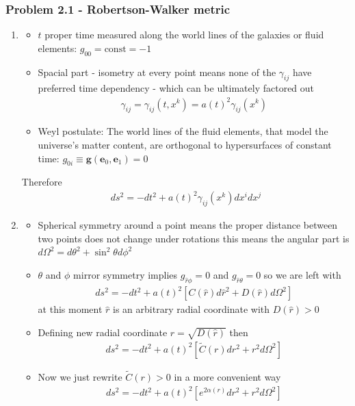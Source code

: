 \documentclass[10pt,a4paper]{book}
\theoremstyle{definition}
\begin{document}
\subsubsection{Problem 2.1 - Robertson-Walker metric}
\begin{enumerate}
\item 
\begin{itemize}
\item $t$ proper time measured along the world lines of the galaxies or fluid elements: $g_{00}=\text{const}=-1$
\item Spacial part - isometry at every point means none of the $\gamma_{ij}$ have preferred time dependency -  which can be ultimately factored out 
\begin{align}
\gamma_{ij}=\gamma_{ij}(t,x^k)=a(t)^2\gamma_{ij}(x^k)
\end{align} 
\item Weyl postulate: The world lines of the fluid elements, that model the universe’s matter content, are orthogonal to hypersurfaces of constant time: $g_{0i}\equiv\mathbf{g}(\mathbf{e}_0,\mathbf{e}_1)=0$
\end{itemize}
Therefore
\begin{align}
ds^2=-dt^2+a(t)^2\gamma_{ij}(x^k)dx^idx^j
\end{align}
\item 
\begin{itemize}
\item Spherical symmetry around a point means the proper distance between two points does not change under rotations this means the angular part is $d\Omega^2=d\theta^2+\sin^2\theta d\phi^2$
\item $\theta$ and $\phi$ mirror symmetry implies $g_{\hat{r}\phi}=0$ and $g_{\hat{r}\theta}=0$ so we are left with
\begin{align}
ds^2=-dt^2+a(t)^2\left[C(\hat{r})d\hat{r}^2+D(\hat{r})d\Omega^2\right]
\end{align}
at this moment $\hat{r}$ is an arbitrary radial coordinate with $D(\hat{r})>0$
\item Defining new radial coordinate $r=\sqrt{D(\hat{r})}$ then
\begin{align}
ds^2=-dt^2+a(t)^2\left[\tilde{C}(r)dr^2+r^2d\Omega^2\right]
\end{align}
\item Now we just rewrite $\tilde{C}(r)>0$ in a more convenient way
\begin{align}
ds^2=-dt^2+a(t)^2\left[e^{2\alpha(r)}dr^2+r^2d\Omega^2\right]
\end{align}

\end{itemize}
\end{enumerate}
\end{document}
